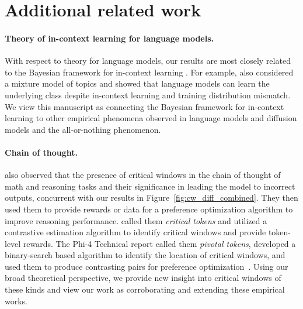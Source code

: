 \appendix
\onecolumn
\section{Additional related work}\label{sec:app:related_work_cont}
\paragraph{Theory of in-context learning for language models.} With respect to theory for language models, our results are most closely related to the Bayesian framework for in-context learning \citep{xie2022explanationincontextlearningimplicit,akyurek2023learningalgorithmincontextlearning, garg2023transformerslearnincontextcase,zhang2023doesincontextlearninglearn,arora2024bayesianscalinglawsincontext}. For example, \citep{xie2022explanationincontextlearningimplicit} also considered a mixture model of topics and showed that language models can learn the underlying class despite in-context learning and training distribution mismatch. We view this manuscript as connecting the Bayesian framework for in-context learning to other empirical phenomena observed in language models and diffusion models and the all-or-nothing phenomenon. 

\paragraph{Chain of thought.} \citep{lin2024criticaltokensmattertokenlevel,abdin2024phi4technicalreport} also observed that the presence of critical windows in the chain of thought of math and reasoning tasks and their significance in leading the model to incorrect outputs, concurrent with our results in Figure~\ref{fig:cw_diff_combined}. They then used them to provide rewards or data for a preference optimization algorithm to improve reasoning performance. \citep{lin2024criticaltokensmattertokenlevel} called them \emph{critical tokens} and utilized a contrastive estimation algorithm to identify critical windows and provide token-level rewards. The Phi-4 Technical report called them \emph{pivotal tokens}, developed a binary-search based algorithm to identify the location of critical windows, and used them to produce contrasting pairs for preference optimization~\citep{abdin2024phi4technicalreport}. Using our broad theoretical perspective, we provide new insight into critical windows of these kinds and view our work as corroborating and extending these empirical works.

